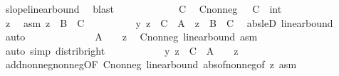 \begin{isabellebody}
\ slope{\isacharunderscore}{\kern0pt}linear{\isacharunderscore}{\kern0pt}bound\ \isamarkupfalse%
\ blast\isanewline
\ \ \ \ \isacommand{{\isacharbraceleft}{\kern0pt}}\isamarkupfalse%
\isanewline
\ \ \ \ \ \ \isamarkupfalse%
\ C\ \isamarkupfalse%
\ C{\isacharunderscore}{\kern0pt}nonneg{\isacharcolon}{\kern0pt}\ {\isachardoublequoteopen}{}\ {\isasymle}\ {\isacharparenleft}{\kern0pt}C\ {\isacharcolon}{\kern0pt}{\isacharcolon}{\kern0pt}\ int{\isacharparenright}{\kern0pt}{\isachardoublequoteclose}\isanewline
\ \ \ \ \ \ \isacommand{{\isacharbraceleft}{\kern0pt}}\isamarkupfalse%
\isanewline
\ \ \ \ \ \ \ \ \isamarkupfalse%
\ z\ \isamarkupfalse%
\ asm{\isacharcolon}{\kern0pt}\ {\isachardoublequoteopen}z\ {\isasymge}\ B\ {\isacharplus}{\kern0pt}\ C{\isachardoublequoteclose}\isanewline
\ \ \ \ \ \ \ \ \isamarkupfalse%
\ {\isachardoublequoteopen}y\ z\ {\isacharplus}{\kern0pt}\ C\ {\isasymle}\ A\ {\isacharasterisk}{\kern0pt}\ {\isasymbar}z{\isasymbar}\ {\isacharplus}{\kern0pt}\ B\ {\isacharplus}{\kern0pt}\ C{\isachardoublequoteclose}\ \isamarkupfalse%
\ abs{\isacharunderscore}{\kern0pt}le{\isacharunderscore}{\kern0pt}D{}\ linear{\isacharunderscore}{\kern0pt}bound\ \isamarkupfalse%
\ auto\isanewline
\ \ \ \ \ \ \ \ \isamarkupfalse%
\ \isamarkupfalse%
\ {\isachardoublequoteopen}{\isachardot}{\kern0pt}{\isachardot}{\kern0pt}{\isachardot}{\kern0pt}\ {\isasymle}\ {\isacharparenleft}{\kern0pt}A\ {\isacharplus}{\kern0pt}\ {}{\isacharparenright}{\kern0pt}\ {\isacharasterisk}{\kern0pt}\ {\isasymbar}z{\isasymbar}{\isachardoublequoteclose}\ \isamarkupfalse%
\ C{\isacharunderscore}{\kern0pt}nonneg\ linear{\isacharunderscore}{\kern0pt}bound{\isacharparenleft}{\kern0pt}{}{\isacharcomma}{\kern0pt}{}{\isacharparenright}{\kern0pt}\ asm\ \isamarkupfalse%
\ {\isacharparenleft}{\kern0pt}auto\ simp{\isacharcolon}{\kern0pt}\ distrib{\isacharunderscore}{\kern0pt}right{\isacharparenright}{\kern0pt}\isanewline
\ \ \ \ \ \ \ \ \isamarkupfalse%
\ \isamarkupfalse%
\ {\isachardoublequoteopen}y\ z\ {\isacharplus}{\kern0pt}\ C\ {\isasymle}\ {\isacharparenleft}{\kern0pt}A\ {\isacharplus}{\kern0pt}\ {}{\isacharparenright}{\kern0pt}\ {\isacharasterisk}{\kern0pt}\ z{\isachardoublequoteclose}\ \isamarkupfalse%
\ add{\isacharunderscore}{\kern0pt}nonneg{\isacharunderscore}{\kern0pt}nonneg{\isacharbrackleft}{\kern0pt}OF\ C{\isacharunderscore}{\kern0pt}nonneg\ linear{\isacharunderscore}{\kern0pt}bound{\isacharparenleft}{\kern0pt}{}{\isacharparenright}{\kern0pt}{\isacharbrackright}{\kern0pt}\ abs{\isacharunderscore}{\kern0pt}of{\isacharunderscore}{\kern0pt}nonneg{\isacharbrackleft}{\kern0pt}of\ z{\isacharbrackright}{\kern0pt}\ asm\ \isamarkupfalse%

\end{isabellebody}
